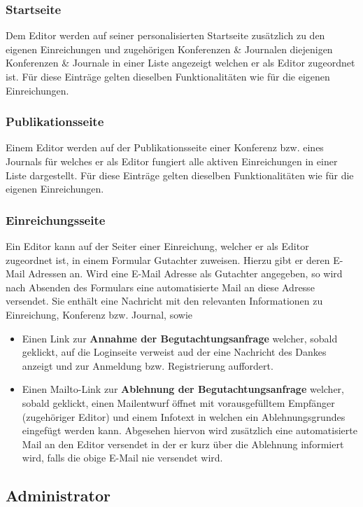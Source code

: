 \subsubsection{Startseite}
\begin{description}
    \XXitem{} Dem Editor werden auf seiner personalisierten Startseite zusätzlich zu den eigenen
    Einreichungen und zugehörigen Konferenzen \& Journalen diejenigen Konferenzen & Journale in einer
    Liste angezeigt welchen er als Editor zugeordnet ist.
    Für diese Einträge gelten dieselben Funktionalitäten wie für die eigenen Einreichungen. %
\end{description}

\subsubsection{Publikationsseite}
\begin{description}
    \XXitem{} Einem Editor werden auf der Publikationsseite einer Konferenz bzw. eines Journals für
    welches er als Editor fungiert alle aktiven Einreichungen in einer Liste dargestellt.
    Für diese Einträge gelten dieselben Funktionalitäten wie für die eigenen Einreichungen. %
\end{description}

\subsubsection{Einreichungsseite}
\begin{description}
    \XXitem{} Ein Editor kann auf der Seiter einer Einreichung, welcher er als Editor zugeordnet ist,
    in einem Formular Gutachter zuweisen. Hierzu gibt er deren E-Mail Adressen an.
    \XXitem{} Wird eine E-Mail Adresse als Gutachter angegeben, so wird nach Absenden des Formulars
    eine automatisierte Mail an diese Adresse versendet. Sie enthält eine Nachricht mit den relevanten
    Informationen zu Einreichung, Konferenz bzw. Journal, sowie
    \begin{itemize}
        \item Einen Link zur \textbf{Annahme der Begutachtungsanfrage} welcher, sobald geklickt,
        auf die Loginseite verweist aud der eine Nachricht des Dankes anzeigt und zur Anmeldung bzw.
        Registrierung auffordert.
        \item Einen Mailto-Link zur \textbf{Ablehnung der Begutachtungsanfrage} welcher, sobald
        geklickt, einen Mailentwurf öffnet mit vorausgefülltem Empfänger (zugehöriger Editor)
        und einem Infotext in welchen ein Ablehnungsgrundes eingefügt werden kann.
        Abgesehen hiervon wird zusätzlich eine automatisierte Mail an den Editor versendet in der er
        kurz über die Ablehnung informiert wird, falls die obige E-Mail nie versendet wird.
    \end{itemize}
\end{description}

\subsection{Administrator}

